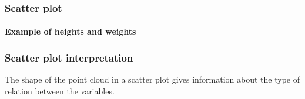 \begin{frame}
\frametitle{Scatter plot}
\framesubtitle{Example of heights and weights}
\begin{center}
\resizebox{0.9\textwidth}{!}{}
\end{center}
\end{frame}


\begin{frame}
\frametitle{Scatter plot interpretation}
The shape of the point cloud in a scatter plot gives information about the type of relation between the variables.

\begin{center}
\end{center}
\end{frame}


